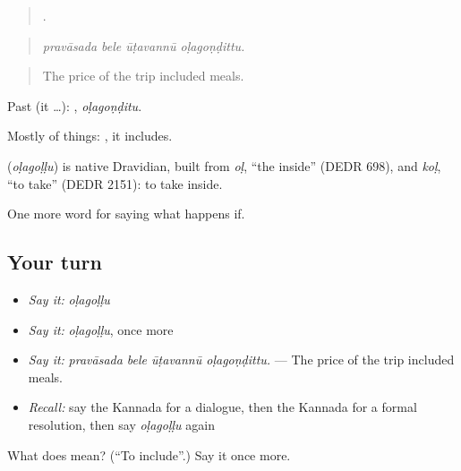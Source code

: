 \begin{quote}
   .
\end{quote}

\begin{quote}
\emph{pravāsada bele ūṭavannū oḷagoṇḍittu.}
\end{quote}

\begin{quote}
The price of the trip included meals.
\end{quote}

Past (it …): , \emph{oḷagoṇḍitu}.

Mostly of things: , it includes.

\begin{cousinweb}
\textbf{} (\emph{oḷagoḷḷu}) is native Dravidian, built from \emph{oḷ}, \textquotedblleft{}the inside\textquotedblright{} (DEDR 698), and \emph{koḷ}, \textquotedblleft{}to take\textquotedblright{} (DEDR 2151): to take inside.
\end{cousinweb}

\begin{grammarlens}[title={What you've built}]
One more word for saying what happens if.
\end{grammarlens}

\subsection*{Your turn}
\begin{itemize}
\raggedright
  \item \emph{Say it:} \emph{oḷagoḷḷu}
  \item \emph{Say it:} \emph{oḷagoḷḷu}, once more
  \item \emph{Say it:} \emph{pravāsada bele ūṭavannū oḷagoṇḍittu.} — The price of the trip included meals.
  \item \emph{Recall:} say the Kannada for a dialogue, then the Kannada for a formal resolution, then say \emph{oḷagoḷḷu} again
\end{itemize}

\begin{tcolorbox}[breakable,colback=teal!4,colframe=teal!35!black,title={Before you move on}]
What does  mean? (\textquotedblleft{}To include\textquotedblright{}.) Say it once more.
\end{tcolorbox}
